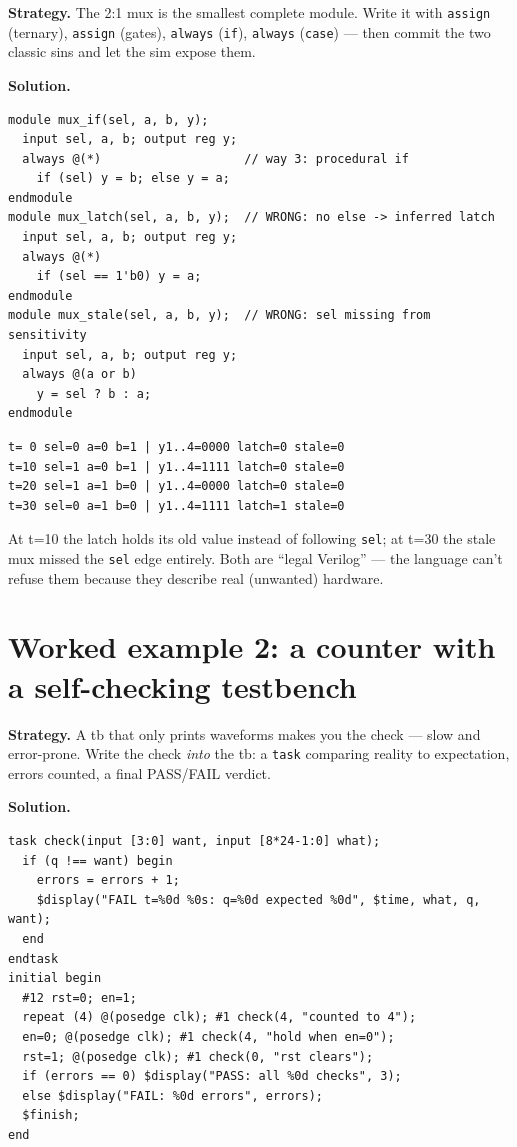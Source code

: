 \textbf{Strategy.} The 2:1 mux is the smallest complete module. Write it
with \texttt{assign} (ternary), \texttt{assign} (gates),
\texttt{always} (\texttt{if}), \texttt{always} (\texttt{case}) --- then
commit the two classic sins and let the sim expose them.

\textbf{Solution.}
\begin{lstlisting}[caption={\ttfamily code/ch11\_mux4.v --- four legal
muxes plus the two wrong ones (abridged).},label={lst:mux4}]
module mux_if(sel, a, b, y);
  input sel, a, b; output reg y;
  always @(*)                    // way 3: procedural if
    if (sel) y = b; else y = a;
endmodule
module mux_latch(sel, a, b, y);  // WRONG: no else -> inferred latch
  input sel, a, b; output reg y;
  always @(*)
    if (sel == 1'b0) y = a;
endmodule
module mux_stale(sel, a, b, y);  // WRONG: sel missing from sensitivity
  input sel, a, b; output reg y;
  always @(a or b)
    y = sel ? b : a;
endmodule
\end{lstlisting}

\begin{lstlisting}[caption={Real run of \ttfamily ch11\_mux4\_tb.v.
Notice t=10: the legal muxes go to \texttt{b=1}, the latch and the
stale copy stay at 0 --- the two bugs caught in one row each.},
abovecaptionskip=0pt]
t= 0 sel=0 a=0 b=1 | y1..4=0000 latch=0 stale=0
t=10 sel=1 a=0 b=1 | y1..4=1111 latch=0 stale=0
t=20 sel=1 a=1 b=0 | y1..4=0000 latch=0 stale=0
t=30 sel=0 a=1 b=0 | y1..4=1111 latch=1 stale=0
\end{lstlisting}

At t=10 the latch holds its old value instead of following
\texttt{sel}; at t=30 the stale mux missed the \texttt{sel} edge
entirely. Both are ``legal Verilog'' --- the language can't refuse them
because they describe real (unwanted) hardware.

\section{Worked example 2: a counter with a self-checking testbench}
\label{sec:we-counter2}

\textbf{Strategy.} A tb that only prints waveforms makes you the check
--- slow and error-prone. Write the check \emph{into} the tb: a
\texttt{task} comparing reality to expectation, errors counted, a final
PASS/FAIL verdict.

\textbf{Solution.}
\begin{lstlisting}[caption={\ttfamily code/ch11\_counter2\_tb.v ---
the check task and the three assertions.},label={lst:tb2}]
task check(input [3:0] want, input [8*24-1:0] what);
  if (q !== want) begin
    errors = errors + 1;
    $display("FAIL t=%0d %0s: q=%0d expected %0d", $time, what, q, want);
  end
endtask
initial begin
  #12 rst=0; en=1;
  repeat (4) @(posedge clk); #1 check(4, "counted to 4");
  en=0; @(posedge clk); #1 check(4, "hold when en=0");
  rst=1; @(posedge clk); #1 check(0, "rst clears");
  if (errors == 0) $display("PASS: all %0d checks", 3);
  else $display("FAIL: %0d errors", errors);
  $finish;
end
\end{lstlisting}


